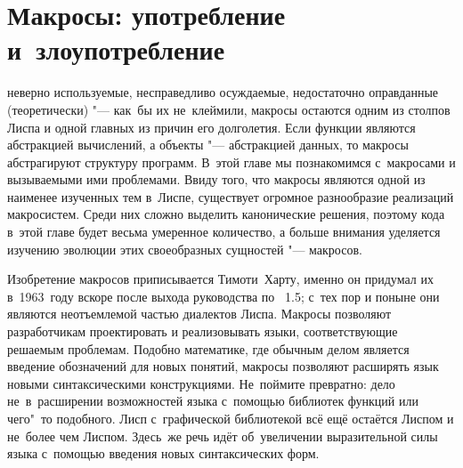 \chapter{Макросы: употребление и~злоупотребление}\label{chapter:macros}

 неверно используемые,
несправедливо осуждаемые, недостаточно оправданные (теоретически) "--- как~бы их
не~клеймили, макросы остаются одним из столпов Лиспа и одной главных из причин
его долголетия. Если функции являются абстракцией вычислений, а объекты "---
абстракцией данных, то макросы абстрагируют структуру программ. В~этой главе мы
познакомимся с~макросами и вызываемыми ими проблемами. Ввиду того, что макросы
являются одной из наименее изученных тем в~Лиспе, существует огромное
разнообразие реализаций макросистем. Среди них сложно выделить канонические
решения, поэтому кода в~этой главе будет весьма умеренное количество, а больше
внимания уделяется изучению эволюции этих своеобразных сущностей "--- макросов.

\bigskip

Изобретение макросов приписывается \cite{sg93} Тимоти~Харту, именно он придумал
их в~1963~году вскоре после выхода руководства по \LISP~1.5; с~тех пор и поныне
они являются неотъемлемой частью диалектов Лиспа. Макросы позволяют
разработчикам проектировать и реализовывать языки, соответствующие решаемым
проблемам. Подобно математике, где обычным делом является введение обозначений
для новых понятий, макросы позволяют расширять язык новыми синтаксическими
конструкциями. Не~поймите превратно: дело не~в~расширении возможностей языка
с~помощью библиотек функций или чего"~то подобного. Лисп с~графической
библиотекой всё ещё остаётся Лиспом и не~более чем Лиспом. Здесь~же речь идёт
об~увеличении выразительной силы языка с~помощью введения новых синтаксических
форм.


